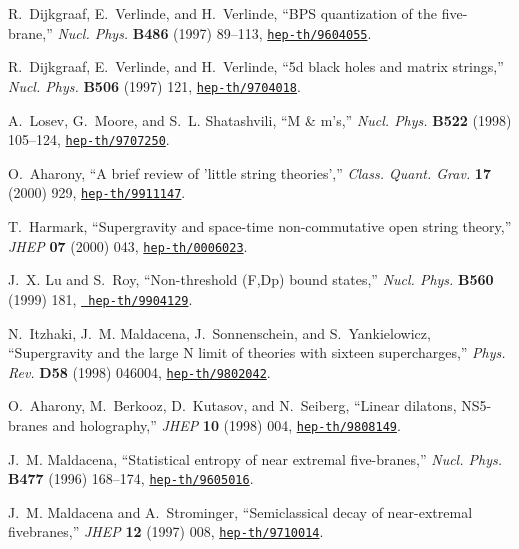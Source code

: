 \documentclass[a4paper,twoside,titlepage,12pt]{article}
\begin{document}
\begin{thebibliography}{10}
R.~Dijkgraaf, E.~Verlinde, and H.~Verlinde, ``{BPS} quantization of the
  five-brane,'' {\em Nucl. Phys.} {\bf B486} (1997) 89--113,
  \href{http://xxx.lanl.gov/abs/hep-th/9604055}{{\tt hep-th/9604055}}.

R.~Dijkgraaf, E.~Verlinde, and H.~Verlinde, ``5d black holes and matrix
  strings,'' {\em Nucl. Phys.} {\bf B506} (1997) 121,
  \href{http://xxx.lanl.gov/abs/hep-th/9704018}{{\tt hep-th/9704018}}.

A.~Losev, G.~Moore, and S.~L. Shatashvili, ``M {\&} m's,'' {\em Nucl. Phys.}
  {\bf B522} (1998) 105--124,
  \href{http://xxx.lanl.gov/abs/hep-th/9707250}{{\tt hep-th/9707250}}.

O.~Aharony, ``A brief review of 'little string theories','' {\em Class. Quant.
  Grav.} {\bf 17} (2000) 929,
  \href{http://xxx.lanl.gov/abs/hep-th/9911147}{{\tt hep-th/9911147}}.

T.~Harmark, ``Supergravity and space-time non-commutative open string theory,''
  {\em JHEP} {\bf 07} (2000) 043,
  \href{http://xxx.lanl.gov/abs/hep-th/0006023}{{\tt hep-th/0006023}}.

J.~X. Lu and S.~Roy, ``Non-threshold {(F,Dp)} bound states,'' {\em Nucl. Phys.}
  {\bf B560} (1999) 181, \href{http://xxx.lanl.gov/abs/hep-th/9904129}{{\tt
  hep-th/9904129}}.

N.~Itzhaki, J.~M. Maldacena, J.~Sonnenschein, and S.~Yankielowicz,
  ``Supergravity and the large {N} limit of theories with sixteen
  supercharges,'' {\em Phys. Rev.} {\bf D58} (1998) 046004,
  \href{http://xxx.lanl.gov/abs/hep-th/9802042}{{\tt hep-th/9802042}}.

O.~Aharony, M.~Berkooz, D.~Kutasov, and N.~Seiberg, ``Linear dilatons,
  {NS5-branes} and holography,'' {\em JHEP} {\bf 10} (1998) 004,
  \href{http://xxx.lanl.gov/abs/hep-th/9808149}{{\tt hep-th/9808149}}.

J.~M. Maldacena, ``Statistical entropy of near extremal five-branes,'' {\em
  Nucl. Phys.} {\bf B477} (1996) 168--174,
  \href{http://xxx.lanl.gov/abs/hep-th/9605016}{{\tt hep-th/9605016}}.

J.~M. Maldacena and A.~Strominger, ``Semiclassical decay of near-extremal
  fivebranes,'' {\em JHEP} {\bf 12} (1997) 008,
  \href{http://xxx.lanl.gov/abs/hep-th/9710014}{{\tt hep-th/9710014}}.


\end{thebibliography}
\end{document}
